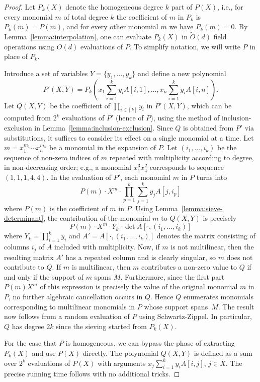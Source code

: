 \documentclass{theoretics}
\begin{document}
\begin{proof}
  Let $P_k(X)$ denote the homogeneous degree $k$ part of $P(X)$, i.e.,
  for every monomial $m$ of total degree $k$ the coefficient of $m$ in $P_k$
  is $P_k(m)=P(m)$, and for every other monomial $m$ we have $P_k(m)=0$. 
  By Lemma~\ref{lemma:interpolation}, one can evaluate $P_k(X)$ in
  $\tilde{O}(d)$ field operations using $O(d)$ evaluations of $P$.
  To simplify notation, we will write $P$ in place of $P_k$.

  Introduce a set of variables $Y=\{y_1,\ldots,y_k\}$ and define a new polynomial
  \[
    P'(X,Y) = P_k\left(x_1 \sum_{i=1}^k y_i A[i,1], \ldots, x_n \sum_{i=1}^k y_i A[i,n]\right).
  \]
  Let $Q(X,Y)$ be the coefficient of $\prod_{i \in [k]} y_i$ in $P'(X,Y)$, which
  can be computed from $2^k$ evaluations of $P'$ (hence of $P$),
  using the method of inclusion-exclusion in Lemma~\ref{lemma:inclusion-exclusion}. Since $Q$ is
  obtained from $P'$ via substitutions, it suffices to consider its effect on a single monomial at a time.
  Let $m=x_1^{m_1} \cdots x_n^{m_n}$ be a monomial in the expansion of $P$.
  Let $(i_1,\ldots,i_k)$ be the sequence of non-zero indices of $m$
  repeated with multiplicity according to degree, in non-decreasing order; e.g.,
  a monomial $x_1^3x_4^2$ corresponds to sequence $(1,1,1,4,4)$.
  In the evaluation of $P'$, each monomial $m$ in $P$ turns into
  \[
    P(m) \cdot X^m \cdot \prod_{p=1}^k \sum_{j=1}^k y_j A[j,i_p]
  \]
  where $P(m)$ is the coefficient of $m$ in $P$. Using Lemma~\ref{lemma:sieve-determinant},
  the contribution of the monomial $m$ to $Q(X,Y)$ is precisely
  \[
    P(m) \cdot X^m \cdot Y_k \cdot \det A[\cdot,(i_1,\ldots,i_k)]
  \]
  where $Y_k=\prod_{i=1}^k y_i$ and $A'=A[\cdot,(i_1,\ldots,i_k)]$ denotes the
  matrix consisting of columns $i_j$ of $A$ included with multiplicity. 
  Now, if $m$ is not multilinear, then the resulting matrix $A'$ has a repeated column
  and is clearly singular, so $m$ does not contribute to $Q$. If $m$ is multilinear,
  then $m$ contributes a non-zero value to $Q$ if and only if the
  support of $m$ spans $M$. Furthermore, since the first part
  $P(m) X^m$ of this expression is precisely the value of the original
  monomial $m$ in $P$, no further algebraic cancellation occurs in $Q$.
  Hence $Q$ enumerates monomials corresponding to multilinear
  monomials in $P$ whose support spans~$M$. The result now follows
  from a random evaluation of $P$ using Schwartz-Zippel. In particular, 
  $Q$ has degree $2k$ since the sieving started from $P_k(X)$.

  For the case that $P$ is homogeneous, we can bypass the phase of
  extracting $P_k(X)$ and use $P(X)$ directly. The polynomial $Q(X,Y)$
  is defined as a sum over $2^k$ evaluations of $P(X)$
  with arguments $x_j \sum_{i=1}^k y_i A[i,j]$, $j \in X$. 
  The precise running time follows with no additional tricks.   
\end{proof}
\end{document}
